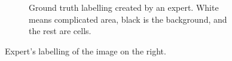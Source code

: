 \documentclass[
  digital,     %
  oneside,     %
  nosansbold,  %
  nocolorbold, %
  lof,         %
  lot,         %
]{fithesis4}
\begin{document}
\begin{figure}
\begin{subfigure}[t]{0.4\textwidth}
        \caption{Ground truth labelling created by an expert. White means
        complicated area, black is the background, and the rest are cells.}
        \label{fig:label_ground_truth}
    \end{subfigure}
    \caption{Expert's labelling of the image on the right.}
    \label{fig:labelling_example}
\end{figure}
\end{document}
